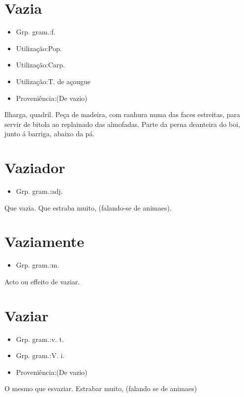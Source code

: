 \documentclass{article}
\begin{document}
\section{Vazia}
\begin{itemize}
\item {Grp. gram.:f.}
\end{itemize}
\begin{itemize}
\item {Utilização:Pop.}
\end{itemize}
\begin{itemize}
\item {Utilização:Carp.}
\end{itemize}
\begin{itemize}
\item {Utilização:T. de açougue}
\end{itemize}
\begin{itemize}
\item {Proveniência:(De \textunderscore vazio\textunderscore )}
\end{itemize}
Ilharga, quadril.
Peça de madeira, com ranhura numa das faces estreitas, para servir de bitola ao replainado das almofadas.
Parte da perna deanteira do boi, junto á barriga, abaixo da pá.
\section{Vaziador}
\begin{itemize}
\item {Grp. gram.:adj.}
\end{itemize}
Que vazia.
Que estraba muito, (falando-se de animaes).
\section{Vaziamente}
\begin{itemize}
\item {Grp. gram.:m.}
\end{itemize}
Acto ou effeito de vaziar.
\section{Vaziar}
\begin{itemize}
\item {Grp. gram.:v. t.}
\end{itemize}
\begin{itemize}
\item {Grp. gram.:V. i.}
\end{itemize}
\begin{itemize}
\item {Proveniência:(De \textunderscore vazio\textunderscore )}
\end{itemize}
O mesmo que \textunderscore esvaziar\textunderscore .
Estrabar muito, (falando se de animaes)
\end{document}
